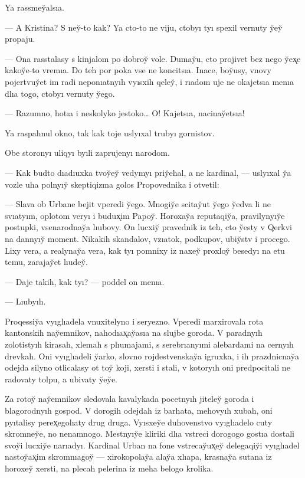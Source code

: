 \documentclass[10pt]{book}
\begin{document}
Ya rassmey̆alsıa.

— A Kristina? S ney̆-to kak? Ya cto-to ne viju, ctobyı tyı spexil vernuty y̆ey̆ propaju.

— Ona rasstalasy s kinjalom po dobroy̆ vole. Dumay̆u, cto projivet bez nego y̆ex̨e kakoy̆e-to vremıa. Do teh por poka vse ne koncitsıa. Inace, boy̆usy, vnovy pojertvuy̆et im radi neponıatnyıh vyısxih qeley̆, i rıadom uje ne okajetsıa menıa dlıa togo, ctobyı vernuty y̆ego.

— Razumno, hotıa i neskolyko jestoko… O! Kajetsıa, nacinay̆etsıa!

Ya raspahnul okno, tak kak toje uslyıxal trubyı gornistov.

Obe storonyı uliqyı byıli zaprujenyı narodom.

— Kak budto dıadıuxka tvoy̆ey̆ vedymyı priy̆ehal, a ne kardinal, — uslyıxal y̆a vozle uha polnyıy̆ skeptiqizma golos Propovednika i otvetil:

— Slava ob Urbane bejit vperedi y̆ego. Mnogiy̆e scitay̆ut y̆ego y̆edva li ne svıatyım, oplotom veryı i budux̨im Papoy̆. Horoxay̆a reputaqiy̆a, pravilynyıy̆e postupki, vsenarodnay̆a lıubovy. On lucxiy̆ pravednik iz teh, cto y̆esty v Qerkvi na dannyıy̆ moment. Nikakih skandalov, vzıatok, podkupov, ubiy̆stv i procego. Lixy vera, a realynay̆a vera, kak tyı pomnixy iz naxey̆ proxloy̆ besedyı na etu temu, zarajay̆et lıudey̆.

— Daje takih, kak tyı? — poddel on menıa.

— Lıubyıh.

Proqessiy̆a vyıglıadela vnuxitelyno i seryezno. Vperedi marxirovala rota kantonskih nay̆emnikov, nahodıax̨ay̆asıa na slujbe goroda. V paradnyıh zolotistyıh kirasah, xlemah s plıumajami, s serebrıanyımi alebardami na cernyıh drevkah. Oni vyıglıadeli y̆arko, slovno rojdestvenskay̆a igruxka, i ih prazdnicnay̆a odejda silyno otlicalasy ot toy̆ koji, xersti i stali, v kotoryıh oni predpocitali ne radovaty tolpu, a ubivaty y̆ey̆e.

Za rotoy̆ nay̆emnikov sledovala kavalykada pocetnyıh jiteley̆ goroda i blagorodnyıh gospod. V dorogih odejdah iz barhata, mehovyıh xubah, oni pyıtalisy perex̨egolıaty drug druga. Vyısxey̆e duhovenstvo vyıglıadelo cuty skromney̆e, no nenamnogo. Mestnyıy̆e kliriki dlıa vstreci dorogogo gostıa dostali svoy̆i lucxiy̆e narıadyı. Kardinal Urban na fone vstrecay̆ux̨ey̆ delegaqiy̆i vyıglıadel nastoy̆ax̨im skromnıagoy̆ — xirokopolay̆a alay̆a xlıapa, krasnay̆a sutana iz horoxey̆ xersti, na plecah pelerina iz meha belogo krolika.
\end{document}
